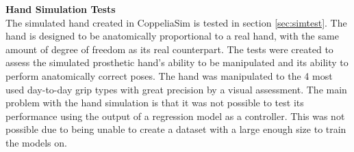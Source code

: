 \documentclass[../main.tex]{subfiles}
\begin{document}
\textbf{Hand Simulation Tests}\\
The simulated hand created in CoppeliaSim \cite{coppeliasim} is tested in section \ref{sec:simtest}.
The hand is designed to be anatomically proportional to a real hand, with the same amount of degree of freedom as its real counterpart.
The tests were created to assess the simulated prosthetic hand's ability to be manipulated and its ability to perform anatomically correct poses.
The hand was manipulated to the 4 most used day-to-day grip types with great precision by a visual assessment.
The main problem with the hand simulation is that it was not possible to test its performance using the output of a regression model as a controller.
This was not possible due to being unable to create a dataset with a large enough size to train the
models on.








\end{document}
